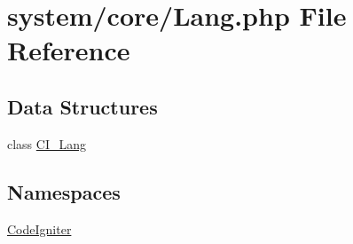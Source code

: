 \hypertarget{_lang_8php}{}\section{system/core/\+Lang.php File Reference}
\label{_lang_8php}
\subsection*{Data Structures}
\begin{DoxyCompactItemize}
\item 
class \mbox{\hyperlink{class_c_i___lang}{C\+I\+\_\+\+Lang}}
\end{DoxyCompactItemize}
\subsection*{Namespaces}
\begin{DoxyCompactItemize}
\item 
 \mbox{\hyperlink{namespace_code_igniter}{Code\+Igniter}}
\end{DoxyCompactItemize}
